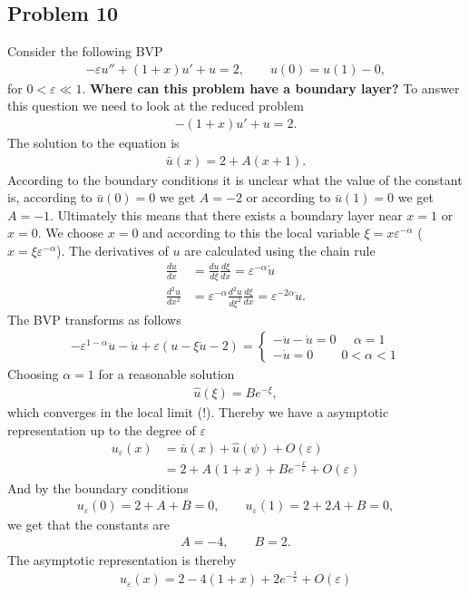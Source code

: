 \documentclass[a4paper]{article}
\newcommand{\eps}{\varepsilon}
\begin{document}
\subsection{Problem 10}
Consider the following BVP
\begin{align}
    -\eps u'' + (1 + x)u' + u = 2, \qquad u(0) = u(1) - 0,
\end{align}
for $0 < \eps \ll 1$. \textbf{Where can this problem have a boundary layer?}
To answer this question we need to look at the reduced problem
\begin{align}
    -(1+x)u' + u = 2.
\end{align}
The solution to the equation is
\begin{align}
    \bar{u}(x) = 2 + A(x+1).
\end{align}
According to the boundary conditions it is unclear what the value of the
constant is, according to $\bar{u}(0)=0$ we get $A = -2$ or according to
$\bar{u}(1)=0$ we get $A = -1$. Ultimately this means that there exists a
boundary layer near $x=1$ or $x=0$. We choose $x=0$ and according to this the
local variable $\xi = x\eps^{-\alpha}$ ($x = \xi \eps^{-\alpha}$). The
derivatives of $u$ are calculated using the chain rule
\begin{align}
    \frac{du}{dx}&= \frac{du}{d\xi}\frac{d\xi}{dx} = \eps^{-\alpha} \dot{u}\\
    \frac{d^2u}{dx^2}&= \eps^{-\alpha} \frac{d^2u}{d\xi^2}\frac{d\xi}{dx} =
    \eps^{-2\alpha} \ddot{u}.
\end{align}
The BVP transforms as follows
\begin{align}
    -\eps^{1-\alpha}\ddot{u} - \dot{u} + \eps(u - \xi\dot{u} - 2) =
    \begin{cases}
        -\ddot{u} - \dot{u} = 0 \;\;\;\;\; \alpha=1\\
        -\dot{u} = 0 \;\;\;\;\;\;\;\; 0<\alpha<1
    \end{cases}
\end{align}
Choosing $\alpha = 1$ for a reasonable solution
\begin{align}
    \hat{u}(\xi) = Be^{-\xi},
\end{align}
which converges in the local limit (!). Thereby we have a asymptotic
representation up to the degree of $\eps$
\begin{align}
    u_\eps(x) &= \bar{u}(x) + \hat{u}(\psi) + O(\eps)\\
              &= 2 + A(1+x) + B e^{-\frac{x}{\eps}}  + O(\eps)
\end{align}
And by the boundary conditions
\begin{align}
    u_\eps(0) = 2+A+B=0, \qquad u_\eps(1) = 2+2A+B=0,
\end{align}
we get that the constants are
\begin{align}
    A = -4, \qquad B = 2.
\end{align}
The asymptotic representation is thereby
\begin{align}
    u_\eps(x) = 2 - 4(1+x) + 2 e^{-\frac{x}{\eps}}  + O(\eps)
\end{align}
\end{document}
